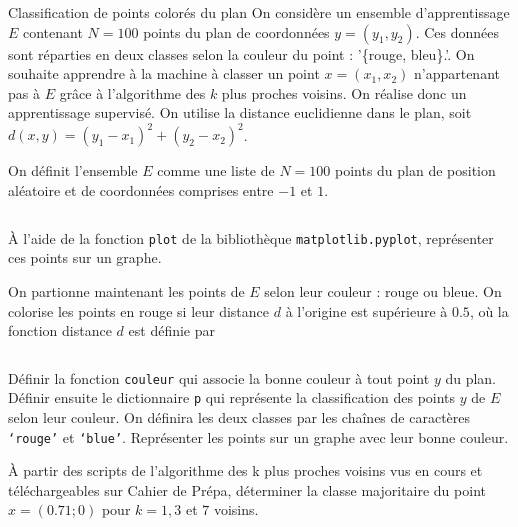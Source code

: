 

\begin{exo}[PC][1][python]{Classification de points colorés du plan}
On considère un ensemble d'apprentissage $E$ contenant $N=100$ points du plan de coordonnées $y=(y_1,y_2)$. Ces données sont réparties en deux classes selon la couleur du point : '\{rouge, bleu\}.'. On souhaite apprendre à la machine à classer un point $x=(x_1,x_2)$ n'appartenant pas à $E$ grâce à l’algorithme des  $k$ plus proches voisins. On réalise donc un apprentissage supervisé. On utilise la distance euclidienne dans le plan, soit $d(x,y) = (y_1-x_1)^2 + (y_2-x_2)^2$. 
\begin{quest}
  \item On définit l'ensemble $E$ comme une liste de $N=100$ points du plan de position aléatoire et de coordonnées comprises entre $-1$ et $1$.
    \inputminted[linenos=true,frame=single]{python}{\pathtoexos/Info/Scripts/E_xy.py}
  À l'aide de la fonction \texttt{plot} de la bibliothèque \texttt{matplotlib.pyplot}, représenter ces points sur un graphe.
  \item On partionne maintenant les points de $E$ selon leur couleur : rouge ou bleue.
  On colorise les points en rouge si leur distance $d$ à l'origine est supérieure à $\num{0.5}$, où la fonction distance $d$ est définie par
    \inputminted[linenos=true,frame=single]{python}{\pathtoexos/Info/Scripts/dist_xy.py}
  Définir la fonction \texttt{couleur} qui associe la bonne couleur à tout point $y$ du plan.
  Définir ensuite le dictionnaire \texttt{p} qui représente la classification des points $y$ de $E$ selon leur couleur.
  On définira les deux classes par les chaînes de caractères \texttt{`rouge'} et \texttt{`blue'}. Représenter les points sur un graphe avec leur bonne couleur.
  \item À partir des scripts de l'algorithme des k plus proches voisins vus en cours et téléchargeables sur Cahier de Prépa, déterminer la classe majoritaire du point $x=(\num{0.71};0)$ pour $k=1,3$ et $7$ voisins.
\end{quest}
\end{exo}


